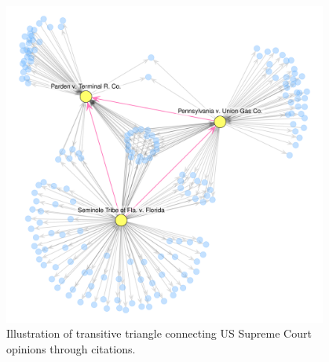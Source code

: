 \documentclass[headsepline=true, abstracton]{scrartcl}
\begin{document}
\begin{figure}[htp]
\centering
\includegraphics[width = 0.95\textwidth,trim= 0cm 1cm 0cm 2cm,clip=true ]{images/citations_trans.pdf}
\caption{Illustration of transitive triangle connecting US Supreme Court opinions through citations.}
\label{fig:transitivity}
\end{figure}
\end{document}
